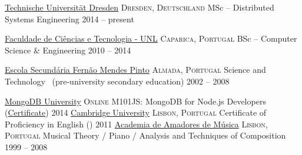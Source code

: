 \documentclass[10pt,a4paper]{article}
\begin{document}
\spacedhrule{-0.2em}{-0.4em}


\headedsection
  {\href{http://www.tu-dresden.de}{Technische Universität Dresden}}
  {\textsc{Dresden, Deutschland}} {
  \headedsubsection
    {MSc -- Distributed Systems Engineering}
    {2014 -- present}
    {}
}

\headedsection
  {\href{http://www.fct.unl.pt}{Faculdade de Ciências e Tecnologia - UNL}}
  {\textsc{Caparica, Portugal}} {
  \headedsubsection
    {BSc -- Computer Science \& Engineering}
    {2010 -- 2014}
    {}
}

\headedsection
  {\href{http://www.esfmp.pt}{Escola Secundária Fernão Mendes Pinto}}
  {\textsc{Almada, Portugal}} {
  \headedsubsection
    {Science and Technology \textnormal{~(pre-university secondary education)}}
    {2002 -- 2008}
    {}
}

\spacedhrule{0.5em}{-0.4em}

\headedsection
  {\href{https://university.mongodb.com}{MongoDB University}}
  {\textsc{Online}} {
  \headedsubsection
    {M101JS: MongoDB for Node.js Developers (\href{http://education.mongodb.com/downloads/certificates/b5bebce320c047bda51f89482ff28948/Certificate.pdf}{Certificate})}
    {2014}
    {}
}
\headedsection
  {\href{http://www.cambridgeenglish.org/}{Cambridge University}}
  {\textsc{Lisbon, Portugal}} {
  \headedsubsection
    {Certificate of Proficiency in English ()}
    {2011}
    {}
}
\headedsection
  {\href{http://www.academiaam.com/}{Academia de Amadores de Música}}
  {\textsc{Lisbon, Portugal}} {
  \headedsubsection
    {Musical Theory / Piano / Analysis and Techniques of Composition}
    {1999 -- 2008}
    {}
}

\spacedhrule{0.5em}{-0.4em}
\end{document}
